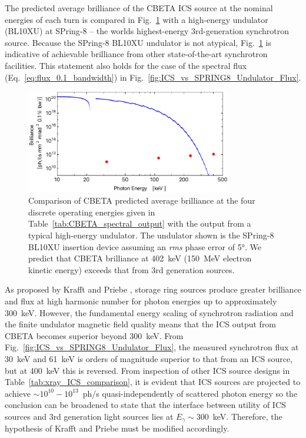 \documentclass[../main.tex]{subfiles}
\begin{document}
The predicted average brilliance of the CBETA ICS source at the nominal energies of each turn is compared in Fig.~\ref{fig:ICS_vs_SPRING8_Undulator_Brilliance} with a high-energy undulator (BL10XU) at SPring-8 -- the worlds highest-energy 3rd-generation synchrotron source. Because the SPring-8 BL10XU undulator is not atypical, Fig.~\ref{fig:ICS_vs_SPRING8_Undulator_Brilliance} is indicative of achievable brilliance from other state-of-the-art synchrotron facilities. This statement also holds for the case of the spectral flux (Eq.~\ref{eq:flux_0.1_bandwidth}) in Fig.~\ref{fig:ICS_vs_SPRING8_Undulator_Flux}.
\begin{figure}[!h]
\centering
\includegraphics[width=0.8\textwidth]{Figures/CBETA_Inverse_Compton_Source_Design/spring8bl10brillianceplot.pdf}
\caption{Comparison of CBETA predicted average brilliance at the four discrete operating energies given in Table~\ref{tab:CBETA_spectral_output} with the output from a typical high-energy undulator. The undulator shown is the SPring-8 BL10XU insertion device \cite{spring8beamlines} assuming an \textit{rms} phase error of 5\si{\degree}. We predict that CBETA brilliance at 402~\si{\kilo\electronvolt} (150~\si{\mega\electronvolt} electron kinetic energy) exceeds that from 3rd generation sources.}
\label{fig:ICS_vs_SPRING8_Undulator_Brilliance}
\end{figure}
As proposed by Krafft and Priebe \cite{krafft2010compton}, storage ring sources produce greater brilliance and flux at high harmonic number for photon energies up to approximately 300~\si{\kilo\electronvolt}. However, the fundamental energy scaling of synchrotron radiation and the finite undulator magnetic field quality means that the ICS output from CBETA becomes superior beyond 300~\si{\kilo\electronvolt}. From Fig.~\ref{fig:ICS_vs_SPRING8_Undulator_Flux}, the measured synchrotron flux at 30~\si{\kilo\electronvolt} and 61~\si{\kilo\electronvolt} \cite{spring8beamlines} is orders of magnitude superior to that from an ICS source, but at 400~\si{\kilo\electronvolt} this is reversed. From inspection of other ICS source designs in Table~\ref{tab:xray_ICS_comparison}, it is evident that ICS sources are projected to achieve $\sim 10^{10} - 10^{13}$~ph/\si{\second} quasi-independently of scattered photon energy so the conclusion can be broadened to state that the interface between utility of ICS sources and 3rd generation light sources lies at $E_{\gamma}\sim 300$~\si{\kilo\electronvolt}. Therefore, the hypothesis of Krafft and Priebe \cite{krafft2010compton} must be modified accordingly.  
\end{document}
